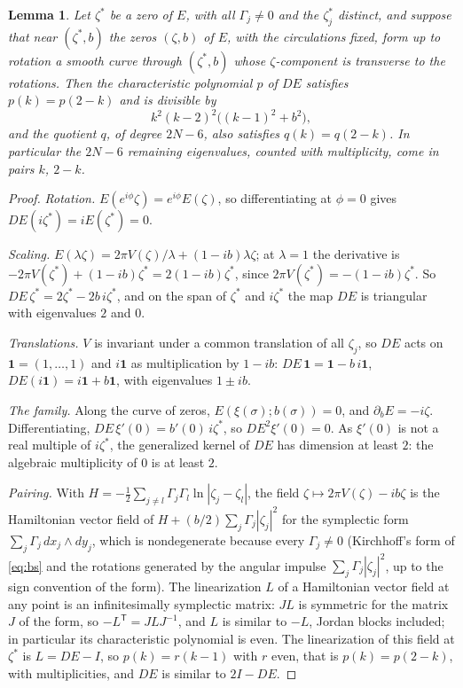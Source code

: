 \documentclass[11pt]{article}
\newtheorem{lemma}{Lemma}
\theoremstyle{definition}
\begin{document}
\begin{lemma}\label{lem:spectrum}
Let $\zeta^*$ be a zero of $E$, with all $\Gamma_j \ne 0$ and the $\zeta_j^*$ distinct, and suppose that near $(\zeta^*, b)$ the zeros $(\zeta, b)$ of $E$, with the circulations fixed, form up to rotation a smooth curve through $(\zeta^*, b)$ whose $\zeta$-component is transverse to the rotations. Then the characteristic polynomial $p$ of $DE$ satisfies $p(k) = p(2 - k)$ and is divisible by
\[
  k^2(k - 2)^2\bigl((k - 1)^2 + b^2\bigr),
\]
and the quotient $q$, of degree $2N - 6$, also satisfies $q(k) = q(2 - k)$. In particular the $2N - 6$ remaining eigenvalues, counted with multiplicity, come in pairs $k$, $2 - k$.
\end{lemma}

\begin{proof}
\emph{Rotation.} $E(e^{i\phi}\zeta) = e^{i\phi}E(\zeta)$, so differentiating at $\phi = 0$ gives $DE(i\zeta^*) = iE(\zeta^*) = 0$.

\emph{Scaling.} $E(\lambda\zeta) = 2\pi V(\zeta)/\lambda + (1 - ib)\lambda\zeta$; at $\lambda = 1$ the derivative is $-2\pi V(\zeta^*) + (1 - ib)\zeta^* = 2(1 - ib)\zeta^*$, since $2\pi V(\zeta^*) = -(1 - ib)\zeta^*$. So $DE\,\zeta^* = 2\zeta^* - 2b\,i\zeta^*$, and on the span of $\zeta^*$ and $i\zeta^*$ the map $DE$ is triangular with eigenvalues $2$ and $0$.

\emph{Translations.} $V$ is invariant under a common translation of all $\zeta_j$, so $DE$ acts on $\mathbf 1 = (1, \ldots, 1)$ and $i\mathbf 1$ as multiplication by $1 - ib$: $DE\,\mathbf 1 = \mathbf 1 - b\,i\mathbf 1$, $DE(i\mathbf 1) = i\mathbf 1 + b\mathbf 1$, with eigenvalues $1 \pm ib$.

\emph{The family.} Along the curve of zeros, $E(\xi(\sigma); b(\sigma)) = 0$, and $\partial_bE = -i\zeta$. Differentiating, $DE\,\xi'(0) = b'(0)\,i\zeta^*$, so $DE^2\xi'(0) = 0$. As $\xi'(0)$ is not a real multiple of $i\zeta^*$, the generalized kernel of $DE$ has dimension at least $2$: the algebraic multiplicity of $0$ is at least $2$.

\emph{Pairing.} With $H = -\frac{1}{2}\sum_{j \ne l}\Gamma_j\Gamma_l\ln|\zeta_j - \zeta_l|$, the field $\zeta \mapsto 2\pi V(\zeta) - ib\zeta$ is the Hamiltonian vector field of $H + (b/2)\sum_j\Gamma_j|\zeta_j|^2$ for the symplectic form $\sum_j\Gamma_j\,dx_j \wedge dy_j$, which is nondegenerate because every $\Gamma_j \ne 0$ (Kirchhoff's form of \eqref{eq:bs} and the rotations generated by the angular impulse $\sum_j\Gamma_j|\zeta_j|^2$, up to the sign convention of the form). The linearization $L$ of a Hamiltonian vector field at any point is an infinitesimally symplectic matrix: $JL$ is symmetric for the matrix $J$ of the form, so $-L^{\mathsf T} = JLJ^{-1}$, and $L$ is similar to $-L$, Jordan blocks included; in particular its characteristic polynomial is even. The linearization of this field at $\zeta^*$ is $L = DE - I$, so $p(k) = r(k - 1)$ with $r$ even, that is $p(k) = p(2 - k)$, with multiplicities, and $DE$ is similar to $2I - DE$.


\end{proof}
\end{document}
